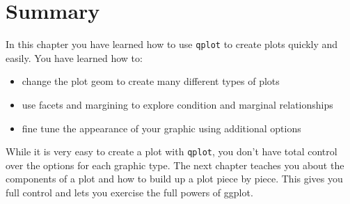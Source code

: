 \section{Summary}

In this chapter you have learned how to use {\tt qplot} to create plots quickly and easily. You have learned how to:

\begin{itemize}
	\item change the plot geom to create many different types of plots
	\item use facets and margining to explore condition and marginal relationships
	\item fine tune the appearance of your graphic using additional options
\end{itemize}

While it is very easy to create a plot with {\tt qplot}, you don't have total control over the options for each graphic type.  The next chapter teaches you about the components of a plot and how to build up a plot piece by piece.  This gives you full control and lets you exercise the full powers of ggplot.  


